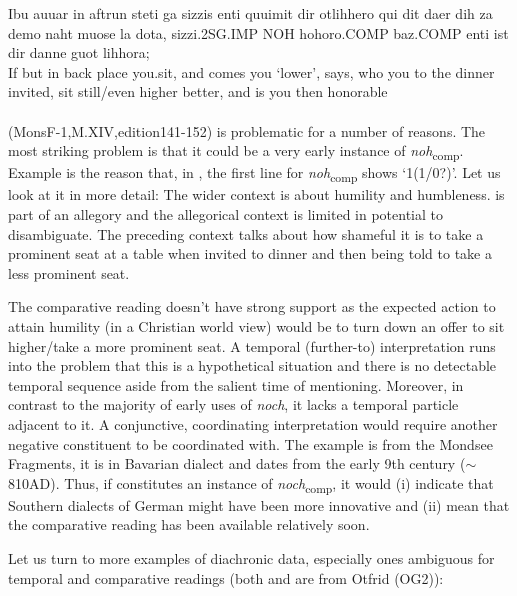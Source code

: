 \documentclass[output=paper,
modfonts
]{langscibook}
\begin{document}
\ea\gll Ibu auuar in aftrun steti {ga sizzis} enti quuimit dir otlihhero {qui dit} daer dih za demo {naht muose} {la dota,} sizzi.2SG.IMP NOH hohoro.COMP baz.COMP enti ist dir danne {guot lihhora;}\\
       If but in back place you.sit, and comes you `lower', says, who you to the dinner invited, sit still/even higher better, and is you then honorable\\
 \label{OG1_comp?_00} \\(MonsF-1,M.XIV,edition141-152)
\z
{} is problematic for a number of reasons. The most striking problem is that it could be a very early instance of \textit{noh}\textsubscript{comp}. Example  is the reason that, in , the first line for \textit{noh}\textsubscript{comp} shows `1(1/0?)'. Let us look at it in more detail: The wider context is about humility and humbleness.  is part of an allegory and the allegorical context is limited in potential to disambiguate. The preceding context talks about how shameful it is to take a prominent seat at a table when invited to dinner and then being told to take a less prominent seat.

The comparative reading doesn't have strong support as the expected action to attain humility (in a Christian world view) would be to turn down an offer to sit higher/take a more prominent seat. A temporal (further-to) interpretation runs into the problem that this is a hypothetical situation and there is no detectable temporal sequence aside from the salient time of mentioning. Moreover, in contrast to the majority of early uses of \textit{noch}, it lacks a temporal particle adjacent to it. A conjunctive, coordinating interpretation would require another negative constituent to be coordinated with. The example is from the Mondsee Fragments, it is in Bavarian dialect and dates from the early 9th century ($\sim$ 810AD)\citep{annis_og}. Thus, if  constitutes an instance of \textit{noch}\textsubscript{comp}, it would (i) indicate that Southern dialects of German might have been more innovative and (ii) mean that the comparative reading has been available relatively soon.

Let us turn to more examples of diachronic data, especially ones ambiguous for temporal and comparative readings (both  and  are from Otfrid (OG2)):
\end{document}
